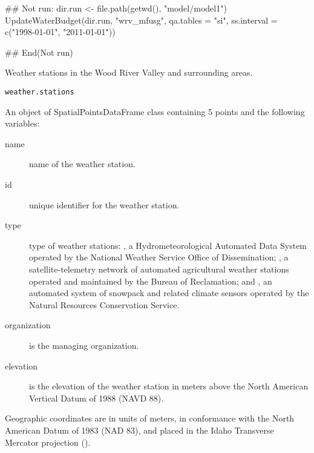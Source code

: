 \documentclass[a4paper]{book}
\begin{document}
%
\begin{Examples}
\begin{ExampleCode}
## Not run: 
  dir.run <- file.path(getwd(), "model/model1")
  UpdateWaterBudget(dir.run, "wrv_mfusg", qa.tables = "si",
                    ss.interval = c("1998-01-01", "2011-01-01"))

## End(Not run)

\end{ExampleCode}
\end{Examples}
%
\begin{Description}\relax
Weather stations in the Wood River Valley and surrounding areas.
\end{Description}
%
\begin{Usage}
\begin{verbatim}
weather.stations
\end{verbatim}
\end{Usage}
%
\begin{Format}
An object of SpatialPointsDataFrame class containing 5 points
and the following variables:
\begin{description}

\item[name] name of the weather station.
\item[id] unique identifier for the weather station.
\item[type] type of weather stations:
, a Hydrometeorological Automated Data System operated by the
National Weather Service Office of Dissemination;
, a satellite-telemetry network of
automated agricultural weather stations operated and
maintained by the Bureau of Reclamation; and
, an automated system of snowpack and
related climate sensors operated by the
Natural Resources Conservation Service.
\item[organization] is the managing organization.
\item[elevation] is the elevation of the weather station in
meters above the North American Vertical Datum of 1988 (NAVD 88).

\end{description}

Geographic coordinates are in units of meters, in conformance with the
North American Datum of 1983 (NAD 83), and placed in the
Idaho Transverse Mercator projection ().
\end{Format}
\end{document}

